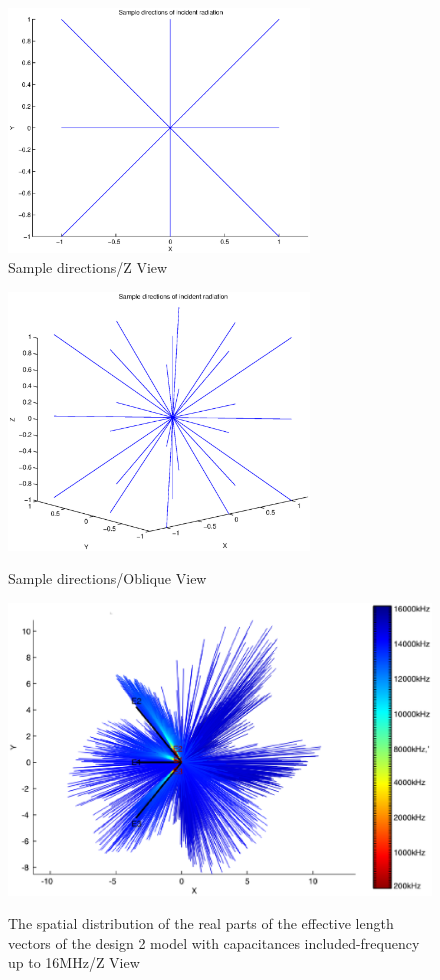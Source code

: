 \documentclass[a4paper,10pt]{thesis}
\begin{document}
\begin{figure}
\begin{center}
\includegraphics[width=8cm]{SampleDirection_ZView.eps}\\
\caption{Sample directions/Z View}\label{fig_sample_z}
\includegraphics[width=8cm]{SampleDirection_oblique.eps} \\
\caption{Sample directions/Oblique View}\label{fig_sample_oblique}
\end{center}
\end{figure}

\begin{figure}
\begin{center}
\includegraphics[scale=0.65]{HeffVerteilungD2-ZView_caps.eps} \\
\caption{The spatial distribution of the real parts of the effective length vectors of the design 2 model with capacitances included-frequency up to 16MHz/Z View }\label{fig_heff_dist_D2_A_Z_View_caps}
\end{center}
\end{figure}
\end{document}
